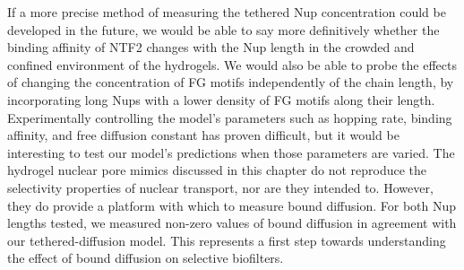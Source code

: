 

If a more precise method of measuring the tethered Nup concentration could be developed in the future, we would be able to say more definitively whether the binding affinity of NTF2 changes with the Nup length in the crowded and confined environment of the hydrogels.  We would also be able to probe the effects of changing the concentration of FG motifs independently of the chain length, by incorporating long Nups with a lower density of FG motifs along their length.  Experimentally controlling the model's parameters such as hopping rate, binding affinity, and free diffusion constant has proven difficult, but it would be interesting to test our model's predictions when those parameters are varied.
The hydrogel nuclear pore mimics discussed in this chapter do not reproduce the selectivity properties of nuclear transport, nor are they intended to.  %
However, they do provide a platform with which to measure bound diffusion.  For both Nup lengths tested, we measured non-zero values of bound diffusion in agreement with our tethered-diffusion model.  This represents a first step towards understanding the effect of bound diffusion on selective biofilters.


